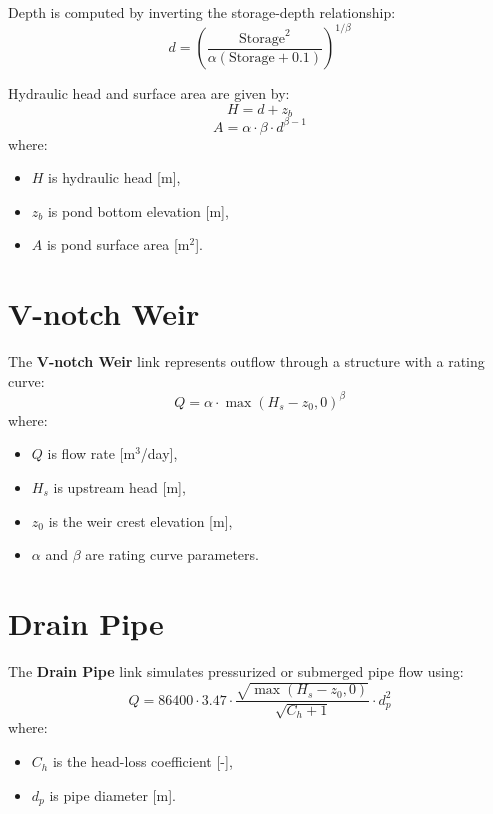 \documentclass[12pt]{report}
\begin{document}
Depth is computed by inverting the storage-depth relationship:
\begin{equation}
d = \left( \frac{\text{Storage}^2}{\alpha(\text{Storage}+0.1)} \right)^{1/\beta}
\end{equation}

Hydraulic head and surface area are given by:
\begin{equation}
H = d + z_b
\end{equation}
\begin{equation}
A = \alpha \cdot \beta \cdot d^{\beta-1}
\end{equation}
where:
\begin{itemize}
\item $H$ is hydraulic head [m],
\item $z_b$ is pond bottom elevation [m],
\item $A$ is pond surface area [m$^2$].
\end{itemize}

\section{V-notch Weir}

The \textbf{V-notch Weir} link represents outflow through a structure with a rating curve:
\begin{equation}
Q = \alpha \cdot \max(H_s - z_0, 0)^{\beta}
\end{equation}
where:
\begin{itemize}
\item $Q$ is flow rate [m$^3$/day],
\item $H_s$ is upstream head [m],
\item $z_0$ is the weir crest elevation [m],
\item $\alpha$ and $\beta$ are rating curve parameters.
\end{itemize}

\section{Drain Pipe}

The \textbf{Drain Pipe} link simulates pressurized or submerged pipe flow using:
\begin{equation}
Q = 86400 \cdot 3.47 \cdot \frac{\sqrt{\max(H_s - z_0, 0)}}{\sqrt{C_h + 1}} \cdot d_p^2
\end{equation}
where:
\begin{itemize}
\item $C_h$ is the head-loss coefficient [-],
\item $d_p$ is pipe diameter [m].
\end{itemize}
\end{document}
